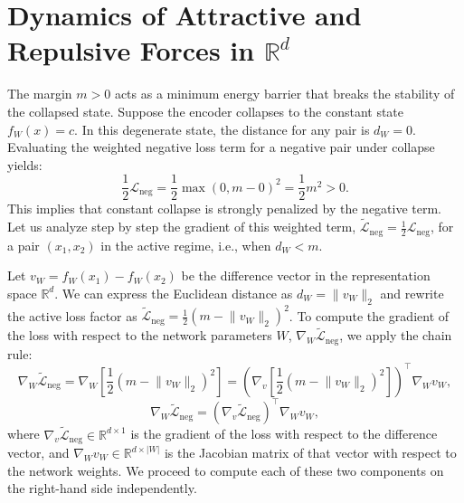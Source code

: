 \documentclass[11pt, oneside, openany]{book}
\begin{document}
\section{Dynamics of Attractive and Repulsive Forces in $\mathbb{R}^{d}$}
\label{sec:4.2}

The margin $m > 0$ acts as a minimum energy barrier that breaks the stability of the collapsed state. Suppose the encoder collapses to the constant state $f_{W}(x) = c$. In this degenerate state, the distance for any pair is $d_{W} = 0$. Evaluating the weighted negative loss term for a negative pair under collapse yields:
\begin{equation}
\label{eq:4.6}
\frac{1}{2}\mathcal{L}_{\text{neg}} = \frac{1}{2}\max(0, m - 0)^{2} = \frac{1}{2}m^{2} > 0.
\end{equation}
This implies that constant collapse is strongly penalized by the negative term. Let us analyze step by step the gradient of this weighted term, $\tilde{\mathcal{L}}_{\text{neg}} = \frac{1}{2}\mathcal{L}_{\text{neg}}$, for a pair $(x_{1}, x_{2})$ in the active regime, i.e., when $d_{W} < m$.

Let $v_{W} = f_{W}(x_{1}) - f_{W}(x_{2})$ be the difference vector in the representation space $\mathbb{R}^{d}$. We can express the Euclidean distance as $d_{W} = \lVert v_{W} \rVert_{2}$ and rewrite the active loss factor as $\tilde{\mathcal{L}}_{\text{neg}} = \frac{1}{2}(m - \lVert v_{W} \rVert_{2})^{2}$. To compute the gradient of the loss with respect to the network parameters $W$, $\nabla_{W} \tilde{\mathcal{L}}_{\text{neg}}$, we apply the chain rule:
\begin{equation}
\label{eq:4.7}
\nabla_{W} \tilde{\mathcal{L}}_{\text{neg}} = \nabla_{W}\left[ \frac{1}{2}(m - \lVert v_{W} \rVert_{2})^{2} \right] = \left( \nabla_{v}\left[ \frac{1}{2}(m - \lVert v_{W} \rVert_{2})^{2} \right] \right)^{\top} \nabla_{W} v_{W},
\end{equation}
\begin{equation}
\label{eq:4.8}
\nabla_{W} \tilde{\mathcal{L}}_{\text{neg}} = (\nabla_{v} \tilde{\mathcal{L}}_{\text{neg}})^{\top} \nabla_{W} v_{W},
\end{equation}
where $\nabla_{v} \tilde{\mathcal{L}}_{\text{neg}} \in \mathbb{R}^{d \times 1}$ is the gradient of the loss with respect to the difference vector, and $\nabla_{W} v_{W} \in \mathbb{R}^{d \times |W|}$ is the Jacobian matrix of that vector with respect to the network weights. We proceed to compute each of these two components on the right-hand side independently.
\end{document}
